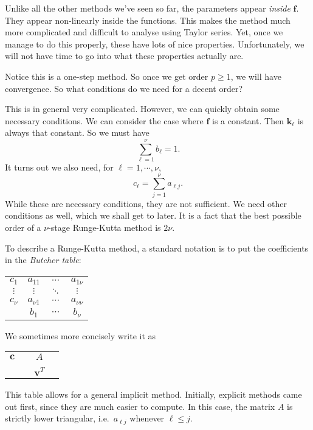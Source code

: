 \documentclass[a4paper]{article}
\begin{document}
Unlike all the other methods we've seen so far, the parameters appear \emph{inside} $\mathbf{f}$. They appear non-linearly inside the functions. This makes the method much more complicated and difficult to analyse using Taylor series. Yet, once we manage to do this properly, these have lots of nice properties. Unfortunately, we will not have time to go into what these properties actually are.

Notice this is a one-step method. So once we get order $p \geq 1$, we will have convergence. So what conditions do we need for a decent order?

This is in general very complicated. However, we can quickly obtain some necessary conditions. We can consider the case where $\mathbf{f}$ is a constant. Then $\mathbf{k}_\ell$ is always that constant. So we must have
\[
  \sum_{\ell = 1}^\nu b_\ell = 1.
\]
It turns out we also need, for $\ell = 1, \cdots, \nu$,
\[
  c_\ell = \sum_{j = 1}^\nu a_{\ell j}.
\]
While these are necessary conditions, they are not sufficient. We need other conditions as well, which we shall get to later. It is a fact that the best possible order of a $\nu$-stage Runge-Kutta method is $2 \nu$.

To describe a Runge-Kutta method, a standard notation is to put the coefficients in the \emph{Butcher table}:
\begin{center}
  \begin{tabular}{c|ccc}
    $c_1$ & $a_{11}$ & $\cdots$ & $a_{1\nu}$\\
    $\vdots$ & $\vdots$ & $\ddots$ & $\vdots$\\
    $c_\nu$ & $a_{\nu 1}$ & $\cdots$ & $a_{\nu\nu}$\\\hline
    & $b_1$ & $\cdots$ & $b_\nu$
  \end{tabular}
\end{center}
We sometimes more concisely write it as
\begin{center}
  \begin{tabular}{c|ccc}
    \\
    $\mathbf{c}$ &\vphantom{a} &{\Large $A$}&\vphantom{a}\\
    \\\hline
    & &$\mathbf{v}^T$
  \end{tabular}
\end{center}
This table allows for a general implicit method. Initially, explicit methods came out first, since they are much easier to compute. In this case, the matrix $A$ is strictly lower triangular, i.e.\ $a_{\ell j}$ whenever $\ell \leq j$.
\end{document}
